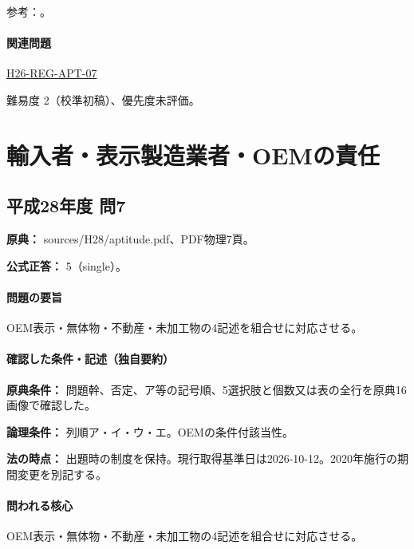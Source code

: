 \par 参考：\cite{pl_statute,pl_qa,pl_definitions2018}。

\paragraph{関連問題} \hyperref[q:h26-reg-apt-07]{H26-REG-APT-07}

\par 難易度 2（校準初稿）、優先度未評価。

\section{輸入者・表示製造業者・OEMの責任}

\subsection{平成28年度 問7}
\label{q:h28-reg-apt-07}

\noindent\textbf{原典：} sources/H28/aptitude.pdf、PDF物理7頁。

\textbf{公式正答：} 5（single）。

\paragraph{問題の要旨} OEM表示・無体物・不動産・未加工物の4記述を組合せに対応させる。

\paragraph{確認した条件・記述（独自要約）}\mbox{}\par

\noindent\textbf{原典条件：} 問題幹、否定、ア等の記号順、5選択肢と個数又は表の全行を原典16画像で確認した。\par

\noindent\textbf{論理条件：} 列順ア・イ・ウ・エ。OEMの条件付該当性。\par

\noindent\textbf{法の時点：} 出題時の制度を保持。現行取得基準日は2026-10-12。2020年施行の期間変更を別記する。\par

\paragraph{問われる核心} OEM表示・無体物・不動産・未加工物の4記述を組合せに対応させる。

